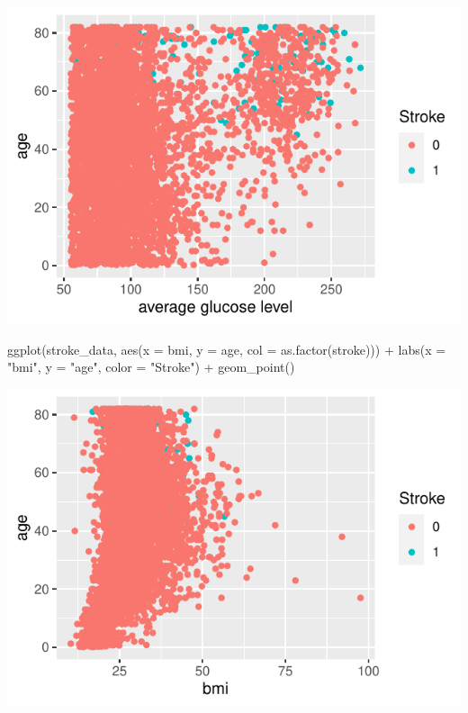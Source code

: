 \documentclass[
]{article}
\newenvironment{Shaded}{\begin{snugshade}}{\end{snugshade}}
\newcommand{\AttributeTok}[1]{\textcolor[rgb]{0.77,0.63,0.00}{#1}}
\newcommand{\FunctionTok}[1]{\textcolor[rgb]{0.00,0.00,0.00}{#1}}
\newcommand{\NormalTok}[1]{#1}
\newcommand{\SpecialCharTok}[1]{\textcolor[rgb]{0.00,0.00,0.00}{#1}}
\newcommand{\StringTok}[1]{\textcolor[rgb]{0.31,0.60,0.02}{#1}}
\begin{document}
\begin{center}\includegraphics{stat-project-stroke_files/figure-latex/unnamed-chunk-11-2} \end{center}

\begin{Shaded}
\begin{Highlighting}[]
\FunctionTok{ggplot}\NormalTok{(stroke\_data, }\FunctionTok{aes}\NormalTok{(}\AttributeTok{x =}\NormalTok{ bmi, }\AttributeTok{y =}\NormalTok{ age, }\AttributeTok{col =} \FunctionTok{as.factor}\NormalTok{(stroke))) }\SpecialCharTok{+}
  \FunctionTok{labs}\NormalTok{(}\AttributeTok{x =} \StringTok{"bmi"}\NormalTok{, }\AttributeTok{y =} \StringTok{"age"}\NormalTok{, }\AttributeTok{color =} \StringTok{"Stroke"}\NormalTok{) }\SpecialCharTok{+} \FunctionTok{geom\_point}\NormalTok{()}
\end{Highlighting}
\end{Shaded}

\begin{center}\includegraphics{stat-project-stroke_files/figure-latex/unnamed-chunk-11-3} \end{center}
\end{document}
